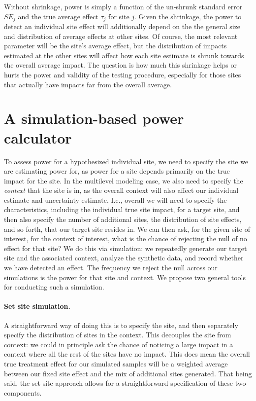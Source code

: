 \documentclass[]{article}
\begin{document}
	Without shrinkage, power is simply a function of the un-shrunk standard error $SE_j$ and the true average effect $\tau_j$ for site $j$.
	Given the shrinkage, the power to detect an individual site effect will additionally depend on the  the general size and distribution of average effects at other sites.
	Of course, the most relevant parameter will be the site's average effect, but the distribution of impacts estimated at the other sites will affect how each site estimate is shrunk towards the overall average impact.
	The question is how much this shrinkage helps or hurts the power and validity of the testing procedure, especially for those sites that actually have impacts far from the overall average.
	
	
	\section{A simulation-based power calculator}
	
	To assess power for a hypothesized individual site, we need to specify the site we are estimating power for, as power for a site depends primarily on the true impact for the site.
	In the multilevel modeling case, we also need to specify the \emph{context} that the site is in, as the overall context will also affect our individual estimate and uncertainty estimate.
	I.e., overall we will need to specify the characteristics, including the individual true site impact, for a target site, and then also specify the number of additional sites, the distribution of site effects, and so forth, that our target site resides in.
	We can then ask, for the given site of interest, for the context of interest, what is the chance of rejecting the null of no effect for that site?
	We do this via simulation: we repeatedly generate our target site and the associated context, analyze the synthetic data, and record whether we have detected an effect.
	The frequency we reject the null across our simulations is the power for that site and context.
	We propose two general tools for conducting such a simulation.
	
	
	\paragraph{Set site simulation.} A straightforward way of doing this is to specify the site, and then separately specify the distribution of sites in the context.
	This decouples the site from context: we could in principle ask the chance of noticing a large impact in a context where all the rest of the sites have no impact.
	This does mean the overall true treatment effect for our simulated samples will be a weighted average between our fixed site effect and the mix of additional sites generated.
	That being said, the set site approach allows for a straightforward specification of these two components.
	
\end{document}
